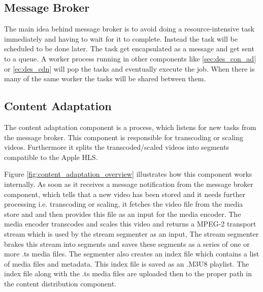 \subsection{Message Broker\label{sec:des_worker_queue}}
The main idea behind message broker is to avoid doing a resource-intensive task immediately and having to wait for it to complete. Instead the task will be scheduled to be done later. The task get encapsulated as a message and  get sent to a queue. A worker process running in other components like \ref{sec:des_con_ad} or \ref{ec:des_cdn} will pop the tasks and eventually execute the job. When there is many of the same worker the tasks will be shared between them.


\subsection{Content Adaptation\label{sec:des_con_ad}}
The content adaptation component is a process, which listens for new tasks from the message broker. This component is responsible for transcoding or scaling videos. Furthermore it splits the transcoded/scaled videos into segments compatible to the Apple \ac{HLS}. %

Figure \ref{fig:content_adaptation_overview} illustrates how this component works internally. As soon as it receives a message notification from the message broker component, which tells that a new video has been stored and it needs further processing i.e. transcoding or scaling, it fetches the video file from the media store and and then provides this file as an input for the media encoder. The media encoder transcodes and scales this video and returns a MPEG-2 transport stream which is used by the stream segmenter as an input, The stream segmenter brakes this stream into segments and saves these segments as a series of one or more .ts media files. The segmenter also creates an index file which contains a list of media files and metadata. This index file is saved as an .M3U8 playlist. The index file along with the .ts media files are uploaded then to the proper path in the content distribution component.


